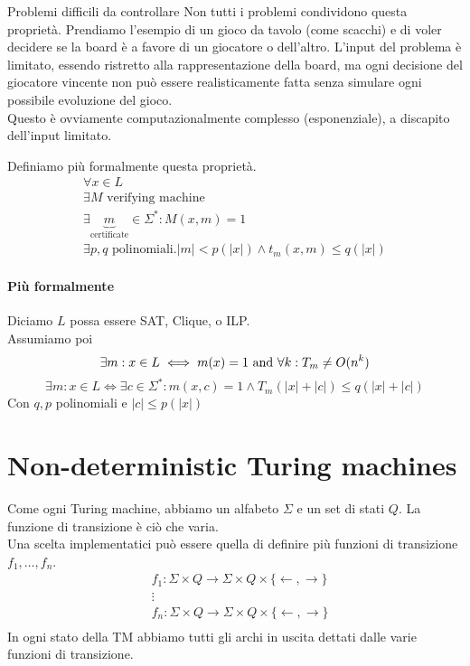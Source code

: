 \documentclass{article}
\begin{document}
\begin{callout}{Problemi difficili da controllare}
    Non tutti i problemi condividono questa proprietà. Prendiamo l'esempio di un gioco da tavolo (come scacchi) e di voler decidere se la board è a favore di un giocatore o dell'altro. L'input del problema è limitato, essendo ristretto alla rappresentazione della board, ma ogni decisione del giocatore vincente non può essere realisticamente fatta senza simulare ogni possibile evoluzione del gioco.\\
    Questo è ovviamente computazionalmente complesso (esponenziale), a discapito dell'input limitato.
\end{callout}

Definiamo più formalmente questa proprietà.
\begin{gather*}
    \forall x \in L \\
    \exists M\text{ verifying machine} \\
    \exists \underbrace{m}_\text{certificate} \in \Sigma^*: M(x,m) = 1 \\
    \exists p,q\text{ polinomiali}. |m|<p(|x|) \wedge t_m(x,m)\leq q(|x|)
\end{gather*}

\paragraph{Più formalmente}
Diciamo $L$ possa essere SAT, Clique, o ILP.\\
Assumiamo poi
\begin{equation*}
    \exists m:x\in L \iff m(x)=1\text{ and } \forall k: T_m\neq O(n^k)
\end{equation*}
\begin{equation*}
    \exists m:x\in L \iff \exists c\in\Sigma^*:m(x,c)=1 \wedge T_m(|x|+|c|)\leq q(|x|+|c|)
\end{equation*}
Con $q,p$ polinomiali e $|c| \leq p(|x|)$

\section{Non-deterministic Turing machines}
Come ogni Turing machine, abbiamo un alfabeto $\Sigma$ e un set di stati $Q$. La funzione di transizione è ciò che varia. \\
Una scelta implementatici può essere quella di definire più funzioni di transizione $f_1, \dots, f_n$. 
\begin{align*}
    & f_1 : \Sigma\times Q \to \Sigma\times Q\times \{\leftarrow,\rightarrow\} \\
    & \vdots \\
    & f_n : \Sigma\times Q \to \Sigma\times Q\times \{\leftarrow,\rightarrow\} \\
\end{align*}
In ogni stato della TM abbiamo tutti gli archi in uscita dettati dalle varie funzioni di transizione.
\end{document}
